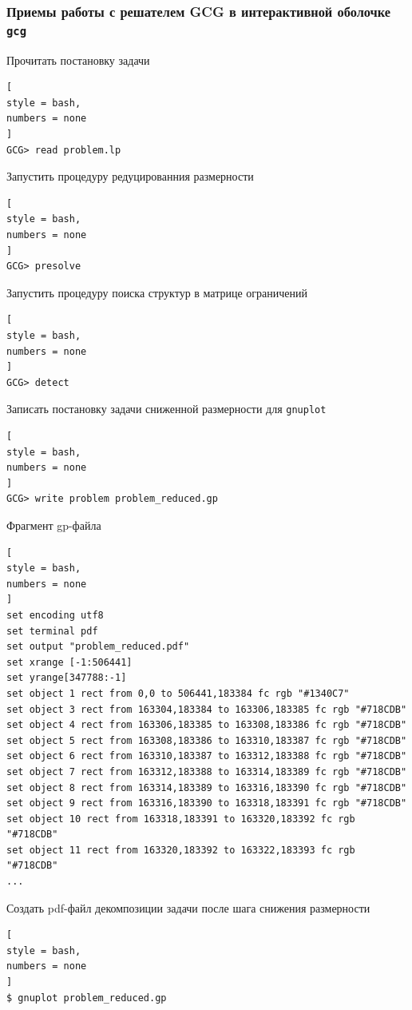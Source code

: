 \documentclass[%
	11pt,
	a4paper,
	utf8,
		]{article}
\begin{document}
\subsubsection{Приемы работы с решателем GCG в интерактивной оболочке \texttt{gcg}}

Прочитать постановку задачи
\begin{lstlisting}[
style = bash,
numbers = none
]
GCG> read problem.lp
\end{lstlisting}

Запустить процедуру редуцированния размерности
\begin{lstlisting}[
style = bash,
numbers = none
]
GCG> presolve
\end{lstlisting}

Запустить процедуру поиска структур в матрице ограничений
\begin{lstlisting}[
style = bash,
numbers = none
]
GCG> detect
\end{lstlisting}

Записать постановку задачи сниженной размерности для \texttt{gnuplot}
\begin{lstlisting}[
style = bash,
numbers = none
]
GCG> write problem problem_reduced.gp
\end{lstlisting}

Фрагмент gp-файла
\begin{lstlisting}[
style = bash,
numbers = none
]
set encoding utf8
set terminal pdf
set output "problem_reduced.pdf"
set xrange [-1:506441]
set yrange[347788:-1]
set object 1 rect from 0,0 to 506441,183384 fc rgb "#1340C7"
set object 3 rect from 163304,183384 to 163306,183385 fc rgb "#718CDB" 
set object 4 rect from 163306,183385 to 163308,183386 fc rgb "#718CDB" 
set object 5 rect from 163308,183386 to 163310,183387 fc rgb "#718CDB" 
set object 6 rect from 163310,183387 to 163312,183388 fc rgb "#718CDB" 
set object 7 rect from 163312,183388 to 163314,183389 fc rgb "#718CDB" 
set object 8 rect from 163314,183389 to 163316,183390 fc rgb "#718CDB" 
set object 9 rect from 163316,183390 to 163318,183391 fc rgb "#718CDB" 
set object 10 rect from 163318,183391 to 163320,183392 fc rgb "#718CDB" 
set object 11 rect from 163320,183392 to 163322,183393 fc rgb "#718CDB" 
...
\end{lstlisting}

Создать pdf-файл декомпозиции задачи после шага снижения размерности
\begin{lstlisting}[
style = bash,
numbers = none
]
$ gnuplot problem_reduced.gp
\end{lstlisting}
\end{document}
